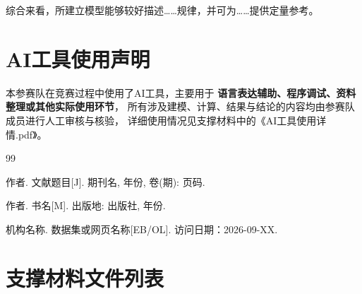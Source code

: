\documentclass[UTF8,fontset=windows,a4paper,12pt]{ctexart}
\begin{document}
综合来看，所建立模型能够较好描述……规律，并可为……提供定量参考。


\section*{AI工具使用声明}

本参赛队在竞赛过程中使用了AI工具，主要用于
\textbf{语言表达辅助、程序调试、资料整理或其他实际使用环节}，
所有涉及建模、计算、结果与结论的内容均由参赛队成员进行人工审核与核验，
详细使用情况见支撑材料中的《AI工具使用详情.pdf》。



\begin{thebibliography}{99}

作者.
\newblock 文献题目[J].
\newblock 期刊名, 年份, 卷(期): 页码.

作者.
\newblock 书名[M].
\newblock 出版地: 出版社, 年份.

机构名称.
\newblock 数据集或网页名称[EB/OL].
\newblock 访问日期：2026-09-XX.

\end{thebibliography}


\clearpage
\appendix

\section{支撑材料文件列表}
\end{document}
